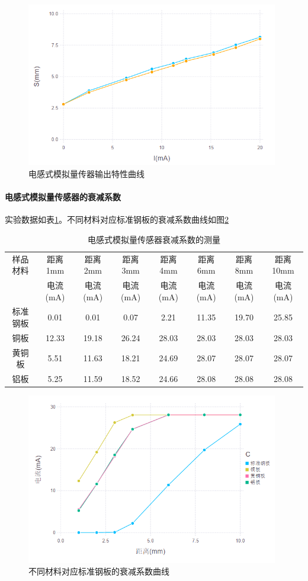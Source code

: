 \begin{figure}[htbp]
\centering
\includegraphics[width=11cm]{resource/af.png}
\caption{电感式模拟量传器输出特性曲线}
\label{fig:af}
\end{figure}

\paragraph{电感式模拟量传感器的衰减系数}
实验数据如表\ref{tab:ad}。不同材料对应标准钢板的衰减系数曲线如图\ref{fig:aff}
\begin{table}[htbp]
	\centering
	\begin{tabular}{|c|c|c|c|c|c|c|c|}
		\hline
		样品材料 & 距离1mm & 距离2mm & 距离3mm & 距离4mm & 距离6mm & 距离8mm & 距离10mm \\
		 & 电流(mA) & 电流(mA) & 电流(mA) & 电流(mA) & 电流(mA) & 电流(mA) & 电流(mA) \\
		\hline
		标准钢板 & 0.01 & 0.01 & 0.07 & 2.21 & 11.35 & 19.70 & 25.85 \\
		铜板 & 12.33 & 19.18 & 26.24 & 28.03 & 28.03 & 28.03 & 28.03 \\
		黄铜板 & 5.51 & 11.63 & 18.21 & 24.69 & 28.07 & 28.07 & 28.07 \\
		铝板 & 5.25 & 11.59 & 18.52 & 24.66 & 28.08 & 28.08 & 28.08 \\
		\hline
	\end{tabular}
	\caption{电感式模拟量传感器衰减系数的测量}
	\label{tab:ad}
\end{table}

\begin{figure}[htbp]
\centering
\includegraphics[width=11cm]{resource/aff.png}
\caption{不同材料对应标准钢板的衰减系数曲线}
\label{fig:aff}
\end{figure}

